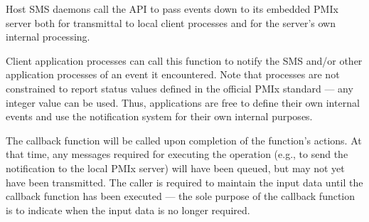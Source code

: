 Host \ac{SMS} daemons call the API to pass events down to its embedded \ac{PMIx} server both for transmittal to local client processes and for the server's own internal processing.

Client application processes can call this function to notify the \ac{SMS} and/or other application processes of an event it encountered. Note that processes are not constrained to report status values defined in the official \ac{PMIx} standard --- any integer value can be used. Thus, applications are free to define their own internal events and use the notification system for their own internal purposes.

\adviceuserstart
The callback function will be called upon completion of the
 function's actions. At that time, any messages required for executing the operation (e.g., to send the notification to the local \ac{PMIx} server) will
have been queued, but may not yet have been transmitted. The caller is required to maintain the input
data until the callback function has been executed --- the sole purpose of the callback function is to indicate when the input data is no longer required.
\adviceuserend


